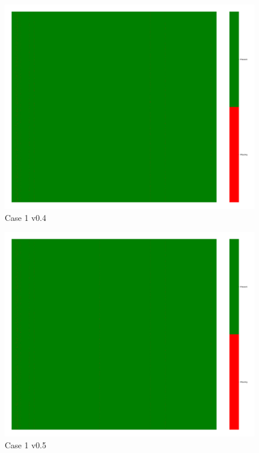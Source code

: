 \documentclass[a4paper,12pt]{article}
\begin{document}
\begin{figure}[H]
    \includegraphics[width=\linewidth]{case1_v0.4_heatmap_cleaned.png}
    \caption*{Case 1 v0.4}
\end{figure}

\begin{figure}[H]
    \includegraphics[width=\linewidth]{case1_v0.5_heatmap_cleaned.png}
    \caption*{Case 1 v0.5}
\end{figure}
\end{document}
